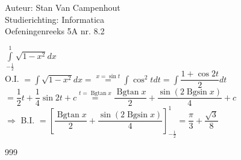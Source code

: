 \documentclass[a4paper]{article}
\begin{document}
  
\noindent \large Auteur: Stan Van Campenhout \\
\noindent \large Studierichting:  Informatica\\
\noindent \large Oefeningenreeks 5A nr. 8.2\\

\medskip

\normalsize

$ \displaystyle\int\limits_{-\tfrac{1}{2}}^1\sqrt{1-x^2}dx $\\

O.I. $ = \displaystyle\int\sqrt{1-x^2}dx = \stackrel{x = \sin t}{=} \displaystyle\int\cos^2tdt = \displaystyle\int\dfrac{1+\cos 2t}{2}dt$\\

$ = \dfrac{1}{2}t + \dfrac{1}{4}\sin 2t + c \stackrel{t = \operatorname{Bgtan}x}{=} \dfrac{\operatorname{Bgtan}x}{2} + \dfrac{\sin\left(2\operatorname{Bgsin}x\right)}{4} + c $\\

$ \Rightarrow $ B.I. $ =  \left[ \dfrac{\operatorname{Bgtan}x}{2} + \dfrac{\sin\left(2\operatorname{Bgsin}x\right)}{4}\right]_{-\tfrac{1}{2}}^1 = \dfrac{\pi}{3} + \dfrac{\sqrt{3}}{8} $\\

\begin{thebibliography}{999}
\end{thebibliography}
\end{document}
